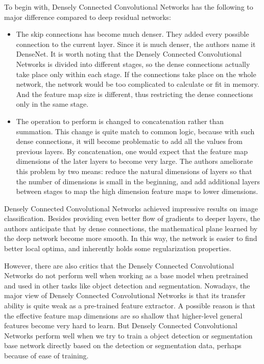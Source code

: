 To begin with, Densely Connected Convolutional Networks has the following to major difference compared to deep residual networks:
\begin{itemize}
	\item The skip connections has become much denser. They added every possible connection to the current layer. Since it is much denser, the authors name it DenseNet. It is worth noting that the Densely Connected Convolutional Networks is divided into different stages, so the dense connections actually take place only within each stage. If the connections take place on the whole network, the network would be too complicated to calculate or fit in memory. And the feature map size is different, thus restricting the dense connections only in the same stage.
	\item The operation to perform is changed to concatenation rather than summation. This change is quite match to common logic, because with such dense connections, it will become problematic to add all the values from previous layers. By concatenation, one would expect that the feature map dimensions of the later layers to become very large. The authors ameliorate this problem by two means: reduce the natural dimensions of layers so that the number of dimensions is small in the beginning, and add additional layers between stages to map the high dimension feature maps to lower dimensions.
\end{itemize}

Densely Connected Convolutional Networks achieved impressive results on image classification. Besides providing even better flow of gradients to deeper layers, the authors anticipate that by dense connections, the mathematical plane learned by the deep network become more smooth. In this way, the network is easier to find better local optima, and inherently holds some regularization properties.

However, there are also critics that the Densely Connected Convolutional Networks do not perform well when working as a base model when pretrained and used in other tasks like object detection and segmentation. Nowadays, the major view of Densely Connected Convolutional Networks is that its transfer ability is quite weak as a pre-trained feature extractor. A possible reason is that the effective feature map dimensions are so shallow that higher-level general features become very hard to learn. But Densely Connected Convolutional Networks perform well when we try to train a object detection or segmentation base network directly based on the detection or segmentation data, perhaps because of ease of training.

